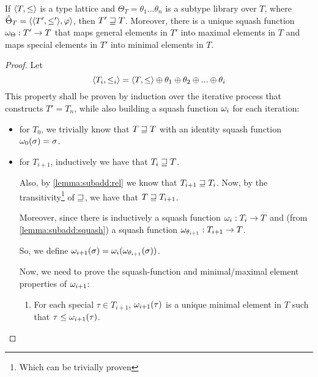 \documentclass[main.tex]{subfiles}
\begin{document}
\begin{prop}\label{prop:makesquashfun}
    If $\langle  T,  \leq  \rangle$ is a type lattice and
    $\Theta_T = \theta_1 ... \theta_n$ is a subtype library over $T$, where
    $\hat{\Theta}_T = \langle \langle  T',  \leq'  \rangle, \varphi \rangle$,
    then $T' \sqsupseteq T$. Moreover, there is a unique squash function
    $\omega_{\Theta} : T' \rightarrow T$ that maps general elements in $T'$ into
    maximal elements in $T$ and maps special elements in $T'$ into minimal elements
    in $T$.
\end{prop}
\begin{proof}
    Let \[
        \langle  T_i,  \leq_i  \rangle = \langle  T,  \leq  \rangle
        \oplus \theta_1 \oplus \theta_2 \oplus ... \oplus \theta_i
    \]
    This property shall be proven by induction over the iterative process
    that constructs $T' = T_n$, while also building a squash function
    $\omega_i$ for each iteration:
    \begin{itemize}
        \item for $T_0$, we trivially know that $T \sqsupseteq T$ with an identity
            squash function $\omega_0(\sigma) = \sigma$.
        \item for $T_{i + 1}$, inductively we have that $T_i \sqsupseteq T$.

            Also, by \cref{lemma:subadd:rel} we know that $T_{i + 1} \sqsupseteq T_{i}$.
            Now, by the transitivity\footnote{Which can be trivially
            proven} of $\sqsupseteq$, we have that $T \sqsupseteq T_{i + 1}$.

            Moreover, since there is inductively a squash function
            $\omega_i : T_i \rightarrow T$ and (from \cref{lemma:subadd:squash})
            a squash function $\omega_{\theta_{i + 1}} : T_{i + 1} \rightarrow T$.

            So, we define
            $\omega_{i + 1}(\sigma) = \omega_i(\omega_{\theta_{i + 1}}(\sigma))$.

            Now, we need to prove the squash-function and minimal/maximal element
            properties of $\omega_{i + 1}$:
            \begin{enumerate}
                \item For each special
                    $\tau \in T_{i + 1}$, $\omega_{i + 1}(\tau)$ is a unique
                    minimal element in $T$ such that $\tau \leq \omega_{i + 1}(\tau)$.


\end{enumerate}
\end{itemize}
\end{proof}
\end{document}
